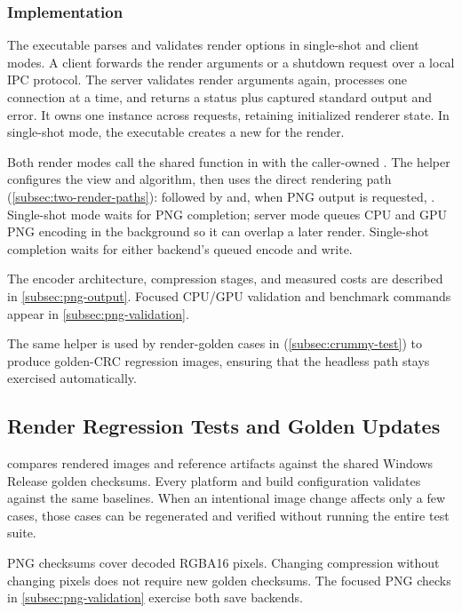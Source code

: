 \subsubsection*{Implementation}

The executable parses and validates render options in single-shot and client
modes. A client forwards the render arguments or a shutdown request over a
local IPC protocol. The server validates render arguments again,
processes one connection at a time, and returns a status plus captured standard
output and error. It owns one  instance across requests, retaining
initialized renderer state. In single-shot mode, the executable creates a new
 for the render.

Both render modes call the shared  function in
 with the caller-owned . The helper configures
the view and algorithm, then uses the direct rendering path
(\cref{subsec:two-render-paths}):  followed by
 and, when PNG output is requested,
. Single-shot mode waits for PNG completion; server
mode queues CPU and GPU PNG encoding in the background so it can overlap a later
render. Single-shot completion waits for either backend's queued encode and write.

The encoder architecture, compression stages, and measured costs are
described in \cref{subsec:png-output}. Focused CPU/GPU validation and
benchmark commands appear in \cref{subsec:png-validation}.

The same  helper is used by
render-golden cases in  (\cref{subsec:crummy-test}) to produce
golden-CRC regression images, ensuring that the headless path stays
exercised automatically.

\subsection{Render Regression Tests and Golden Updates}
\label{subsec:render-regression-goldens}
\label{sec:render-regression-tests}

 compares rendered images and reference artifacts
against the shared Windows Release golden checksums. Every platform and build
configuration validates against the same baselines. When an intentional image
change affects only a few cases, those cases can be regenerated and verified
without running the entire test suite.

PNG checksums cover decoded RGBA16 pixels. Changing compression without
changing pixels does not require new golden checksums. The focused PNG
checks in \cref{subsec:png-validation} exercise both save backends.

